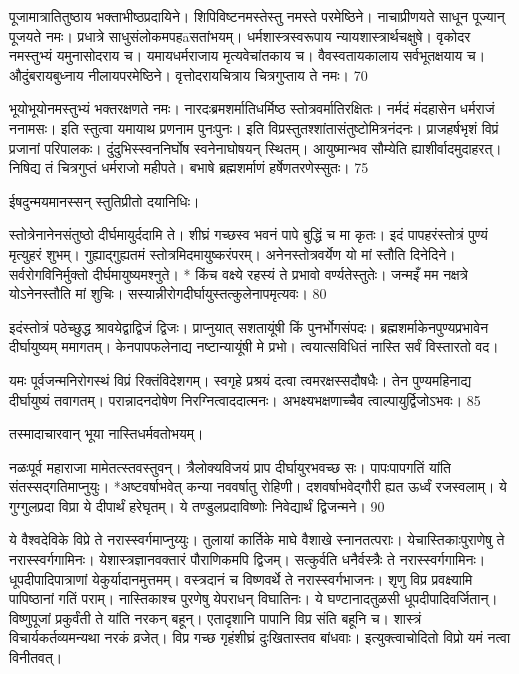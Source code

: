  
पूजामात्रातितुष्ठाय भक्ताभीष्ठप्रदायिने।
 शिपिविष्टनमस्तेस्तु नमस्ते परमेष्ठिने।
 नाचाप्रीणयते साधून पूज्यान् पूजयते नमः।
 प्रधात्रे साधुसंलोकमपहāसतांभयम्।
 धर्मशास्त्रस्वरूपाय न्यायशास्त्रार्थचक्षुषे।
 वृकोदर नमस्तुभ्यं यमुनासोदराय च।
 यमायधर्मराजाय मृत्यवेचांतकाय च।
 वैवस्वतायकालाय सर्वभूतक्षयाय च।
 औदुंबरायबुध्नाय नीलायपरमेष्ठिने।
 वृत्तोदरायचित्राय चित्रगुप्ताय ते नमः।
 70

  भूयोभूयोनमस्तुभ्यं भक्तरक्षणते नमः।
 नारदःब्रमशर्मातिधर्मिष्ठ स्तोत्रवर्मातिरक्षितः।
 नर्मदं मंदहासेन धर्मराजं ननामसः।
 इति स्तुत्वा यमायाथ प्रणनाम पुनःपुनः।
 इति विप्रस्तुतश्शांतासंतुष्टोमित्रनंदनः।
 प्राजहर्षभृशं विप्रं प्रजानां परिपालकः।
 दुंदुभिस्स्वननिर्घोष स्वनेनाघोषयन् स्थितम्।
 आयुष्मान्भव सौम्येति ह्याशीर्वादमुदाहरत्।
 निषिद्य तं चित्रगुप्तं धर्मराजो महीपते।
 बभाषे ब्रह्मशर्माणं हर्षेणतरणेस्सुतः।
 75

  ईषदुन्मयमानस्सन् स्तुतिप्रीतो दयानिधिः।

स्तोत्रेनानेनसंतुष्ठो दीर्घमायुर्ददामि ते।
 शीघ्रं गच्छस्व भवनं पापे बुद्धिं च मा कृतः।
 इदं पापहरंस्तोत्रं पुण्यं मृत्युहरं शुभम्।
 गुह्याद्गुह्यतमं स्तोत्रमिदमायुष्करंपरम्।
 अनेनस्तोत्रवर्येण यो मां स्तौति दिनेदिने।
 सर्वरोगविनिर्मुक्तो दीर्घमायुष्यमश्नुते।
 * किंच वक्ष्ये रहस्यं ते प्रभावो वर्ण्यतेस्तुतेः।
 जन्मइँ मम नक्षत्रे योऽनेनस्तौति मां शुचिः।
 सस्यान्नीरोगदीर्घायुस्तत्कुलेनापमृत्यवः।
 80

  इदंस्तोत्रं पठेच्छुद्ध श्रावयेद्वाद्विजं द्विजः।
 प्राप्नुयात् सशतायूंषी किं पुनर्भोगसंपदः।
 ब्रह्मशर्माकेनपुण्यप्रभावेन दीर्घायुष्यम् ममागतम्।
 केनपापफलेनाद्य नष्टान्यायूंषी मे प्रभो।
 त्वयात्सविधितं नास्ति सर्वं विस्तारतो वद।
 
यमः
पूर्वजन्मनिरोगस्थं विप्रं रिक्तंविदेशगम्।
 स्वगृहे प्रश्रयं दत्वा त्वमरक्षस्सदौषधैः।
 तेन पुण्यमहिनाद्य दीर्घायुष्यं तवागतम्।
 परान्नादनदोषेण निरग्नित्वाददात्मनः।
 अभक्ष्यभक्षणाच्चैव त्वाल्पायुर्द्विजोऽभवः।
 85

  तस्मादाचारवान् भूया नास्तिधर्मवतोभयम्।

नळःपूर्व महाराजा मामेतत्स्तवस्तुवन्।
 त्रैलोक्यविजयं प्राप दीर्घायुरभवच्छ सः।
 पापःपापगतिं यांति संतस्सद्गतिमाप्नुयुः।
 *अष्टवर्षाभवेत् कन्या नववर्षातु रोहिणी।
 दशवर्षाभवेद्गौरी ह्यत ऊर्ध्वं रजस्वलाम्।
 ये गुग्गुलप्रदा विप्रा ये दीपार्थं हरेघृतम्।
 ये तण्डुलप्रदाविष्णोः निवेद्यार्थं द्विजन्मने।
 90

  ये वैश्वदेविके विप्रे ते नरास्स्वर्गमाप्नुय्युः।
 तुलायां कार्तिके माघे वैशाखे स्नानतत्पराः।
 येचास्तिकाःपुराणेषु ते नरास्स्वर्गगामिनः।
 येशास्त्रज्ञानवक्तारं पौराणिकमपि द्विजम्।
 सत्कुर्वति धनैर्वस्त्रैः ते नरास्स्वर्गगामिनः।
 धूपदीपादिपात्राणां येकुर्यादानमुत्तमम्।
 वस्त्रदानं च विष्णवर्थे ते नरास्स्वर्गभाजनः।
 शृणु विप्र प्रवक्ष्यामि पापिष्ठानां गतिं पराम्।
 नास्तिकाश्च पुरणेषु येपराधन् विघातिनः।
 ये घण्टानादतुळसी धूपदीपादिवर्जितान्।
 विष्णुपूजां प्रकुर्वंती ते यांति नरकन् बहून्।
 एतादृशानि पापानि विप्र संति बहूनि च।
 शास्त्रं विचार्यकर्तव्यमन्यथा नरकं व्रजेत्।
 विप्र गच्छ गृहंशीघ्रं दुःखितास्तव बांधवाः।
 इत्युक्त्वाचोदितो विप्रो यमं नत्वा विनीतवत्।
 
